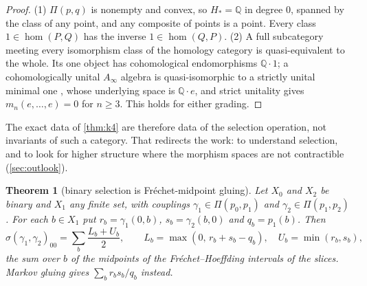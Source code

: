 \documentclass[11pt]{article}
\newtheorem{theorem}{Theorem}\newtheorem{proposition}[theorem]{Proposition}\newtheorem{lemma}[theorem]{Lemma}\newtheorem{corollary}[theorem]{Corollary}\newtheorem{conjecture}[theorem]{Conjecture}\crefname{conjecture}{Conjecture}{Conjectures}
\theoremstyle{definition}\newtheorem{definition}[theorem]{Definition}\newtheorem{remark}[theorem]{Remark}\newtheorem{example}[theorem]{Example}\newtheorem{problem}[theorem]{Open problem}\crefname{problem}{Problem}{Problems}
\begin{document}
\begin{proof}
(1) $\Pi(p,q)$ is nonempty and convex, so $H_*=\mathbb Q$ in degree $0$, spanned by the class of any point, and any composite of points is a point. Every class $1\in\hom(P,Q)$ has the inverse $1\in\hom(Q,P)$.
(2) A full subcategory meeting every isomorphism class of the homology category is quasi-equivalent to the whole. Its one object has cohomological endomorphisms $\mathbb Q\cdot1$; a cohomologically
unital $A_\infty$ algebra is quasi-isomorphic to a strictly unital minimal one \cite{Seidel2008}, whose underlying space is $\mathbb Q\cdot e$, and strict unitality gives $m_n(e,\dots,e)=0$ for $n\ge3$. This
holds for either grading.
\end{proof}

The exact data of \cref{thm:k4} are therefore data of the selection operation, not invariants of such a category. That redirects the work: to understand selection, and to look for higher structure
where the morphism spaces are not contractible (\cref{sec:outlook}).

\begin{theorem}[binary selection is Fr\'echet-midpoint gluing]\label{thm:frechet}
Let $X_0$ and $X_2$ be binary and $X_1$ any finite set, with couplings $\gamma_1\in\Pi(p_0,p_1)$ and $\gamma_2\in\Pi(p_1,p_2)$. For each $b\in X_1$ put $r_b=\gamma_1(0,b)$, $s_b=\gamma_2(b,0)$ and $q_b=p_1(b)$. Then
\[
\sigma(\gamma_1,\gamma_2)_{00}=\sum_b\frac{L_b+U_b}2,\qquad L_b=\max(0,\,r_b+s_b-q_b),\quad U_b=\min(r_b,s_b),
\]
the sum over $b$ of the midpoints of the Fr\'echet--Hoeffding intervals of the slices. Markov gluing gives $\sum_br_bs_b/q_b$ instead.
\end{theorem}
\end{document}

